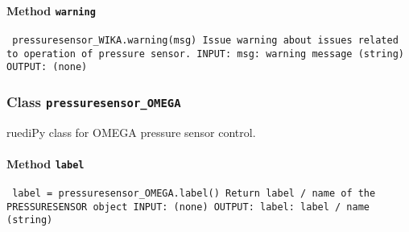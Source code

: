 \paragraph{Method \texttt{warning}}
\vspace{1ex}
\texttt{\newline
pressuresensor_WIKA.warning(msg)\newline
\newline
Issue warning about issues related to operation of pressure sensor.\newline
\newline
INPUT:\newline
msg: warning message (string)\newline
\newline
OUTPUT:\newline
(none)\newline
\newline
}

\subsubsection{Class \texttt{pressuresensor_OMEGA}}
\par
ruediPy class for OMEGA pressure sensor control.\par

\paragraph{Method \texttt{label}}
\vspace{1ex}
\texttt{\newline
label = pressuresensor_OMEGA.label()\newline
\newline
Return label / name of the PRESSURESENSOR object\newline
\newline
INPUT:\newline
(none)\newline
\newline
OUTPUT:\newline
label: label / name (string)\newline
\newline
}

